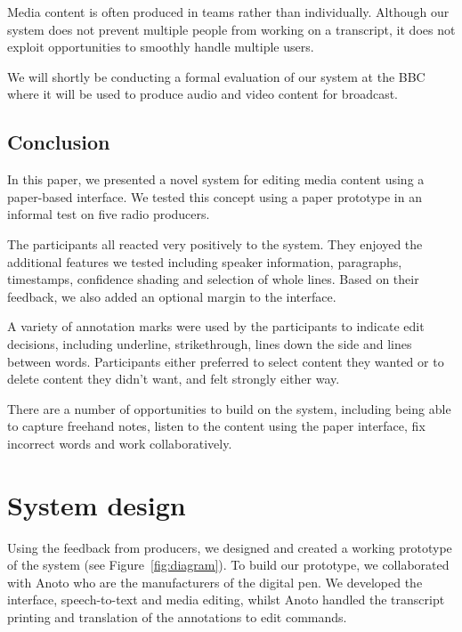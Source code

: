 Media content is often produced in teams rather than individually.  Although
our system does not prevent multiple people from working on a transcript, it
does not exploit opportunities to smoothly handle multiple users.

We will shortly be conducting a formal evaluation of our system at the BBC
where it will be used to produce audio and video content for broadcast. 


\subsection{Conclusion}
In this paper, we presented a novel system for editing media content using a
paper-based interface. We tested this concept using a paper prototype in an
informal test on five radio producers.

The participants all reacted very positively to the system. They enjoyed the
additional features we tested including speaker information, paragraphs,
timestamps, confidence shading and selection of whole lines. Based on their
feedback, we also added an optional margin to the interface.

A variety of annotation marks were used by the participants to indicate edit
decisions, including underline, strikethrough, lines down the side and lines
between words.  Participants either preferred to select content they wanted or
to delete content they didn't want, and felt strongly either way.

There are a number of opportunities to build on the system, including being
able to capture freehand notes, listen to the content using the paper
interface, fix incorrect words and work collaboratively.

\section{System design}
Using the feedback from producers, we designed and created a working prototype
of the system (see Figure~\ref{fig:diagram}). To build our prototype, we
collaborated with Anoto who are the manufacturers of the digital pen. We
developed the interface, speech-to-text and media editing, whilst Anoto
handled the transcript printing and translation of the annotations to edit
commands. 

